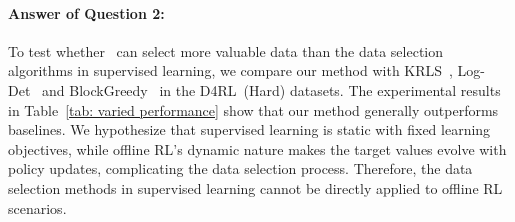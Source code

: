 
\paragraph{Answer of Question 2:}
To test whether \name~can select more valuable data than the data selection algorithms in supervised learning, we compare our method with KRLS~\citep{engel2004kernel}, Log-Det~\citep{seeger2004greedy} and BlockGreedy~\citep{schlegel2017adapting} in the D4RL~(Hard) datasets.
The experimental results in Table~\ref{tab: varied performance} show that our method generally outperforms baselines.
We hypothesize that supervised learning is static with fixed learning objectives, while offline RL's dynamic nature makes the target values evolve with policy updates, complicating the data selection process.
Therefore, the data selection methods in supervised learning cannot be directly applied to offline RL scenarios.



